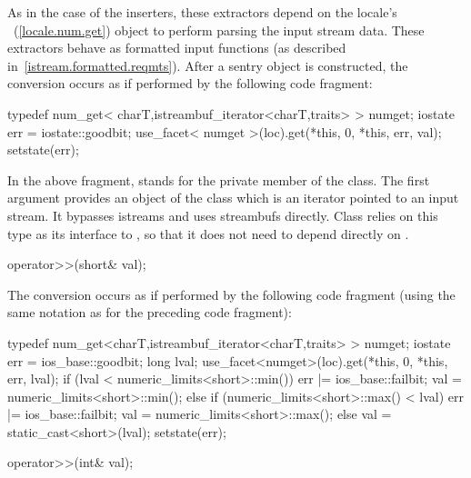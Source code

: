 \begin{itemdescr}
\pnum
As in the case of the inserters, these extractors depend on the
locale's
~(\ref{locale.num.get}) object to perform parsing the input
stream data.
These extractors behave as formatted input functions (as described in~\ref{istream.formatted.reqmts}).  After a sentry object is constructed, the
conversion occurs as if performed by the following code fragment:

\begin{codeblock}
typedef num_get< charT,istreambuf_iterator<charT,traits> > numget;
iostate err = iostate::goodbit;
use_facet< numget >(loc).get(*this, 0, *this, err, val);
setstate(err);
\end{codeblock}

In the above fragment,
stands for the private member of the
class.
\enternote
The first argument provides an object of the
class which is an iterator pointed to an input stream.
It bypasses istreams and uses streambufs directly.
\exitnote
Class
relies on this
type as its interface to
,
so that it does not need to depend directly on
.
\end{itemdescr}

%
\begin{itemdecl}
operator>>(short& val);
\end{itemdecl}

\begin{itemdescr}
\pnum
The conversion occurs as if performed by the following code fragment
(using the same notation as for the preceding code fragment):
\begin{codeblock}
typedef num_get<charT,istreambuf_iterator<charT,traits> > numget;
iostate err = ios_base::goodbit;
long lval;
use_facet<numget>(loc).get(*this, 0, *this, err, lval);
if (lval < numeric_limits<short>::min()) {
  err |= ios_base::failbit;
  val = numeric_limits<short>::min();
} else if (numeric_limits<short>::max() < lval) {
  err |= ios_base::failbit;
  val = numeric_limits<short>::max();
}  else
  val = static_cast<short>(lval);
setstate(err);
\end{codeblock}
\end{itemdescr}

%
\begin{itemdecl}
operator>>(int& val);
\end{itemdecl}

